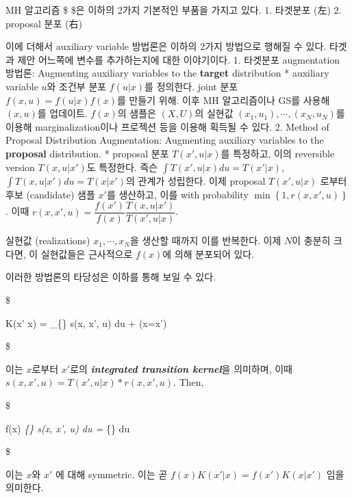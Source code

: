 \documentclass[
]{book}
\begin{document}
MH 알고리즘 \$   \$은 이하의 2가지 기본적인 부품을 가지고 있다.
1. 타겟분포 (左)
2. proposal 분포 (右)

이에 더해서 auxiliary variable 방법론은 이하의 2가지 방법으로 행해질 수 있다. 타겟과 제안 어느쪽에 변수를 추가하는지에 대한 이야기이다.
1. 타겟분포 augmentation 방법론: Augmenting auxiliary variables to the \textbf{target} distribution
* auxiliary variable \(u\)와 조건부 분포 \(f(u \rvert x )\)를 정의한다. joint 분포 \(f(x,u) = f(u \rvert x) f(x)\)를 만들기 위해. 이후 MH 알고리즘이나 GS를 사용해 \((x,u)\)를 업데이트. \(f(x)\)의 샘플은 \((X, U)\)의 실현값 \((x_1, u_1), \cdots, (x_N, u_N)\)를 이용해 marginalization이나 프로젝션 등을 이용해 획득될 수 있다.
2. Method of Proposal Distribution Augmentation: Augmenting auxiliary variables to the \textbf{proposal} distribution.
* proposal 분포 \(T(x', u \rvert x)\)를 특정하고, 이의 reversible version \(T(x, u \rvert x')\)도 특정한다. 즉슨 \(\int T(x', u \vert x)du = T(x' \vert x)\), \(\int T(x, u \vert x')du = T(x \vert x')\)의 관계가 성립한다. 이제 proposal \(T(x', u \vert x)\) 로부터 후보 (candidate) 샘플 \(x'\)를 생산하고, 이를 with probability \(\min \left\{ 1, r(x, x', u) \right \}\). 이때 \(r(x, x', u) = \dfrac {f(x')} {f(x)} \dfrac {T(x,u \vert x')} {T(x',u \vert x)}\).

실현값 (realizations) \(x_1 , \cdots, x_N\)을 생산할 때까지 이를 반복한다. 이제 \(N\)이 충분히 크다면, 이 실현값들은 근사적으로 \(f(x)\)에 의해 분포되어 있다.

이러한 방법론의 타당성은 이하를 통해 보일 수 있다.

\$

K(x' \vert x) = \int\_\{\} s(x, x', u) du + (x=x') 

\$

이는 \(x\)로부터 \(x'\)로의 \textbf{\emph{integrated transition kernel}}을 의미하며, 이때 \(s(x, x', u) = T(x', u \rvert x) \ast r(x, x', u)\). Then,

\$

f(x) \int\emph{\{\} s(x, x', u) du = \int}\{\} \min {} du

\$

이는 \(x\)와 \(x'\) 에 대해 symmetric. 이는 곧 \(f(x)K(x' \vert x) = f(x')K(x \vert x')\) 임을 의미한다.
\end{document}
